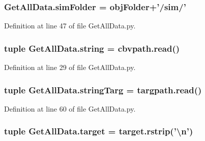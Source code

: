 \hypertarget{namespace_get_all_data_ab8e095b44d1d2a618b9f44a372540200}{
\subsubsection[{sim\-Folder}]{ Get\-All\-Data.\-sim\-Folder = {\bf obj\-Folder}+'/sim/'}}\label{namespace_get_all_data_ab8e095b44d1d2a618b9f44a372540200}


Definition at line 47 of file Get\-All\-Data.\-py.

\hypertarget{namespace_get_all_data_aa3f14258ba79c9dd527fc1805b92c818}{
\subsubsection[{string}]{\setlength{\rightskip}{0pt plus 5cm}tuple Get\-All\-Data.\-string = cbvpath.\-read()}}\label{namespace_get_all_data_aa3f14258ba79c9dd527fc1805b92c818}


Definition at line 29 of file Get\-All\-Data.\-py.

\hypertarget{namespace_get_all_data_a6125644c05ef4f47c70dee8f9f271b21}{
\subsubsection[{string\-Targ}]{\setlength{\rightskip}{0pt plus 5cm}tuple Get\-All\-Data.\-string\-Targ = targpath.\-read()}}\label{namespace_get_all_data_a6125644c05ef4f47c70dee8f9f271b21}


Definition at line 60 of file Get\-All\-Data.\-py.

\hypertarget{namespace_get_all_data_ae7c93a35b37e6a7e1f63026786f921e3}{
\subsubsection[{target}]{\setlength{\rightskip}{0pt plus 5cm}tuple Get\-All\-Data.\-target = target.\-rstrip('\textbackslash{}n')}}\label{namespace_get_all_data_ae7c93a35b37e6a7e1f63026786f921e3}


